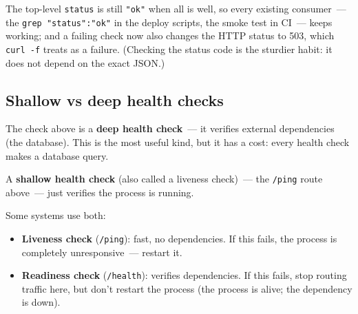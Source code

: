 \begin{codebox}
\begin{Shaded}
\begin{Highlighting}[]
\OperatorTok{=}   
        \NormalTok{: }  \NormalTok{,}

\NormalTok{(}\NormalTok{)}
    \NormalTok{: }\NormalTok{\}), }
\end{Highlighting}
\end{Shaded}

\end{codebox}

\noindent{}The top-level \texttt{status} is still \texttt{"ok"} when all is well, so every existing consumer~--- the \texttt{grep\ \textquotesingle{}"status":"ok"\textquotesingle{}} in the deploy scripts, the smoke test in CI~--- keeps working; and a failing check now also changes the HTTP status to 503, which \texttt{curl\ -f} treats as a failure. (Checking the status code is the sturdier habit: it does not depend on the exact JSON.)

\subsection*{Shallow vs deep health checks}\label{35-observability:shallow-vs-deep-health-checks}

The check above is a \textbf{deep health check}~--- it verifies external dependencies (the database). This is the most useful kind, but it has a cost: every health check makes a database query.

A \textbf{shallow health check} (also called a liveness check)~--- the \texttt{/ping} route above~--- just verifies the process is running.

Some systems use both:

\begin{itemize}
\tightlist
\item
  \textbf{Liveness check} (\texttt{/ping}): fast, no dependencies. If this fails, the process is completely unresponsive~--- restart it.
\item
  \textbf{Readiness check} (\texttt{/health}): verifies dependencies. If this fails, stop routing traffic here, but don't restart the process (the process is alive; the dependency is down).
\end{itemize}

